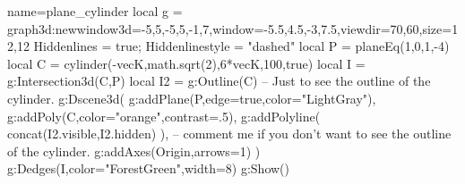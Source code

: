 \documentclass[10pt]{standalone}%
\begin{document}
\begin{luadraw}{name=plane_cylinder}
local g = graph3d:new{window3d={-5,5,-5,5,-1,7},window={-5.5,4.5,-3,7.5},viewdir={70,60},size={12,12}}
Hiddenlines = true; Hiddenlinestyle = "dashed"
local P = planeEq(1,0,1,-4)
local C = cylinder(-vecK,math.sqrt(2),6*vecK,100,true)
local I = g:Intersection3d(C,P)
local I2 = g:Outline(C) -- Just to see the outline of the cylinder.
g:Dscene3d(
    g:addPlane(P,{edge=true,color="LightGray"}),
    g:addPoly(C,{color="orange",contrast=.5}),
    g:addPolyline( concat(I2.visible,I2.hidden) ), -- comment me if you don't want to see the outline of the cylinder.
    g:addAxes(Origin,{arrows=1})
)  
g:Dedges(I,{color="ForestGreen",width=8})
g:Show() 
\end{luadraw}
\end{document}

